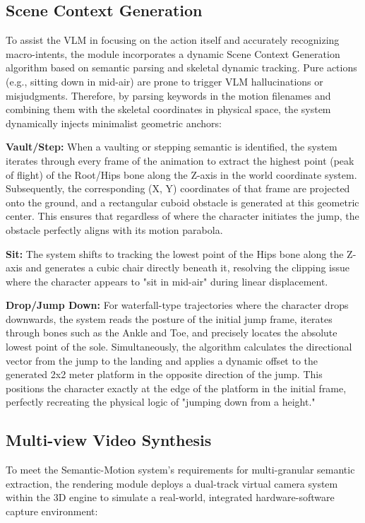 \documentclass[11pt,oneside]{report}
\begin{document}
\subsection{Scene Context Generation}
To assist the VLM in focusing on the action itself and accurately recognizing macro-intents, the module incorporates a dynamic Scene Context Generation algorithm based on semantic parsing and skeletal dynamic tracking. Pure actions (e.g., sitting down in mid-air) are prone to trigger VLM hallucinations or misjudgments. Therefore, by parsing keywords in the motion filenames and combining them with the skeletal coordinates in physical space, the system dynamically injects minimalist geometric anchors:

\textbf{Vault/Step:} When a vaulting or stepping semantic is identified, the system iterates through every frame of the animation to extract the highest point (peak of flight) of the Root/Hips bone along the Z-axis in the world coordinate system. Subsequently, the corresponding (X, Y) coordinates of that frame are projected onto the ground, and a rectangular cuboid obstacle is generated at this geometric center. This ensures that regardless of where the character initiates the jump, the obstacle perfectly aligns with its motion parabola.

\textbf{Sit:} The system shifts to tracking the lowest point of the Hips bone along the Z-axis and generates a cubic chair directly beneath it, resolving the clipping issue where the character appears to "sit in mid-air" during linear displacement.

\textbf{Drop/Jump Down:} For waterfall-type trajectories where the character drops downwards, the system reads the posture of the initial jump frame, iterates through bones such as the Ankle and Toe, and precisely locates the absolute lowest point of the sole. Simultaneously, the algorithm calculates the directional vector from the jump to the landing and applies a dynamic offset to the generated 2x2 meter platform in the opposite direction of the jump. This positions the character exactly at the edge of the platform in the initial frame, perfectly recreating the physical logic of "jumping down from a height."

\subsection{Multi-view Video Synthesis}
To meet the Semantic-Motion system's requirements for multi-granular semantic extraction, the rendering module deploys a dual-track virtual camera system within the 3D engine to simulate a real-world, integrated hardware-software capture environment:
\end{document}
